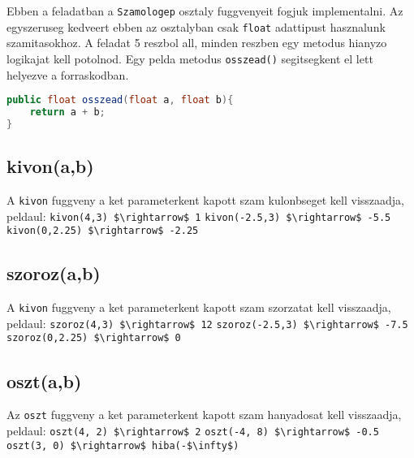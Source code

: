 \documentclass{article}
\begin{document}
Ebben a feladatban a \lstinline{Szamologep} osztaly fuggvenyeit fogjuk implementalni. Az egyszeruseg kedveert ebben az osztalyban csak \lstinline{float} adattipust hasznalunk szamitasokhoz. A feladat 5 reszbol all, minden reszben egy metodus hianyzo logikajat kell potolnod. Egy pelda metodus \lstinline{osszead()} segitsegkent el lett helyezve a forraskodban.

\begin{lstlisting}[language=Java, caption=Pelda Metodus]
public float osszead(float a, float b){
    return a + b;
}
\end{lstlisting}

\subsection{kivon(a,b)}
A \lstinline{kivon} fuggveny a ket parameterkent kapott szam kulonbseget kell visszaadja, peldaul:\newline
\lstinline[mathescape]{kivon(4,3) $\rightarrow$ 1}\newline
\lstinline[mathescape]{kivon(-2.5,3) $\rightarrow$ -5.5}\newline
\lstinline[mathescape]{kivon(0,2.25) $\rightarrow$ -2.25}\newline

\subsection{szoroz(a,b)}
A \lstinline{kivon} fuggveny a ket parameterkent kapott szam szorzatat kell visszaadja, peldaul:\newline
\lstinline[mathescape]{szoroz(4,3) $\rightarrow$ 12}\newline
\lstinline[mathescape]{szoroz(-2.5,3) $\rightarrow$ -7.5}\newline
\lstinline[mathescape]{szoroz(0,2.25) $\rightarrow$ 0}\newline

\subsection{oszt(a,b)}
Az \lstinline{oszt} fuggveny a ket parameterkent kapott szam hanyadosat kell visszaadja, peldaul:\newline
\lstinline[mathescape]{oszt(4, 2) $\rightarrow$ 2}\newline
\lstinline[mathescape]{oszt(-4, 8) $\rightarrow$ -0.5}\newline
\lstinline[mathescape]{oszt(3, 0) $\rightarrow$ hiba(-$\infty$)}\newline
\end{document}
